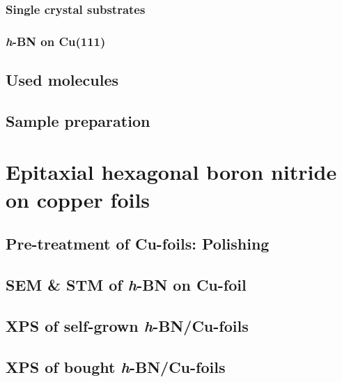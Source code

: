 \documentclass[
twoside,				%
BCOR=8mm,				%
headings=normal,		%
headsepline,			%
footsepline,			%
plainfootsepline,		%
]{scrbook}
\begin{document}
     \subsection{Single crystal substrates}
        
%        
\clearpage             
     \subsection{\textit{h}-BN on Cu(111)}
		
  \section{Used molecules}
    
  \section{Sample preparation}
    

\chapter{Epitaxial hexagonal boron nitride on copper foils}
  
\section{Pre-treatment of Cu-foils: Polishing}
  	
  \section{SEM \& STM of \textit{h}-BN on Cu-foil}
     
  \section{XPS of self-grown \textit{h}-BN/Cu-foils}
     
  \section{XPS of bought \textit{h}-BN/Cu-foils}
     
\end{document}
